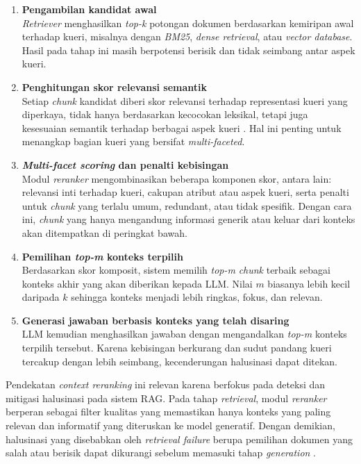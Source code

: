 \begin{enumerate}[1.]
  \item \textbf{Pengambilan kandidat awal} \\
  \textit{Retriever} menghasilkan \textit{top-k} potongan dokumen berdasarkan kemiripan awal terhadap kueri, misalnya dengan \textit{BM25}, \textit{dense retrieval}, atau \textit{vector database}. Hasil pada tahap ini masih berpotensi berisik dan tidak seimbang antar aspek kueri.

  \item \textbf{Penghitungan skor relevansi semantik} \\
  Setiap \textit{chunk} kandidat diberi skor relevansi terhadap representasi kueri yang diperkaya, tidak hanya berdasarkan kecocokan leksikal, tetapi juga kesesuaian semantik terhadap berbagai aspek kueri \parencite{craft2023richresponses}. Hal ini penting untuk menangkap bagian kueri yang bersifat \textit{multi-faceted}.

  \item \textbf{\textit{Multi-facet scoring} dan penalti kebisingan} \\
  Modul \textit{reranker} mengombinasikan beberapa komponen skor, antara lain: relevansi inti terhadap kueri, cakupan atribut atau aspek kueri, serta penalti untuk \textit{chunk} yang terlalu umum, redundant, atau tidak spesifik. Dengan cara ini, \textit{chunk} yang hanya mengandung informasi generik atau keluar dari konteks akan ditempatkan di peringkat bawah.

  \item \textbf{Pemilihan \textit{top-m} konteks terpilih} \\
  Berdasarkan skor komposit, sistem memilih \textit{top-m} \textit{chunk} terbaik sebagai konteks akhir yang akan diberikan kepada LLM. Nilai $m$ biasanya lebih kecil daripada $k$ sehingga konteks menjadi lebih ringkas, fokus, dan relevan.

  \item \textbf{Generasi jawaban berbasis konteks yang telah disaring} \\
  LLM kemudian menghasilkan jawaban dengan mengandalkan \textit{top-m} konteks terpilih tersebut. Karena kebisingan berkurang dan sudut pandang kueri tercakup dengan lebih seimbang, kecenderungan halusinasi dapat ditekan.
\end{enumerate}

Pendekatan \textit{context reranking} ini relevan karena berfokus pada deteksi dan mitigasi halusinasi pada sistem RAG. Pada tahap \textit{retrieval}, modul \textit{reranker} berperan sebagai filter kualitas yang memastikan hanya konteks yang paling relevan dan informatif yang diteruskan ke model generatif. Dengan demikian, halusinasi yang disebabkan oleh \textit{retrieval failure} berupa pemilihan dokumen yang salah atau berisik dapat dikurangi sebelum memasuki tahap \textit{generation} \parencite{math2024hallucination,craft2023richresponses}.

